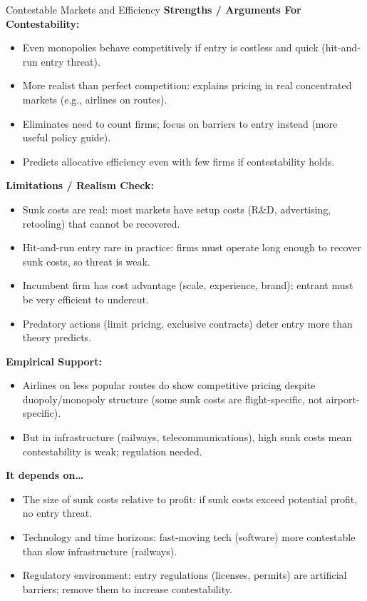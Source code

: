 \documentclass[11pt, a4paper, twoside]{book}
\begin{document}
\begin{evaluation}{Contestable Markets and Efficiency}
\textbf{Strengths / Arguments For Contestability:}
\begin{itemize}[leftmargin=*, nosep]
\item Even monopolies behave competitively if entry is costless and quick (hit-and-run entry threat).
\item More realist than perfect competition: explains pricing in real concentrated markets (e.g., airlines on routes).
\item Eliminates need to count firms; focus on barriers to entry instead (more useful policy guide).
\item Predicts allocative efficiency even with few firms if contestability holds.
\end{itemize}
\textbf{Limitations / Realism Check:}
\begin{itemize}[leftmargin=*, nosep]
\item Sunk costs are real: most markets have setup costs (R\&D, advertising, retooling) that cannot be recovered.
\item Hit-and-run entry rare in practice: firms must operate long enough to recover sunk costs, so threat is weak.
\item Incumbent firm has cost advantage (scale, experience, brand); entrant must be very efficient to undercut.
\item Predatory actions (limit pricing, exclusive contracts) deter entry more than theory predicts.
\end{itemize}
\textbf{Empirical Support:}
\begin{itemize}[leftmargin=*, nosep]
\item Airlines on less popular routes do show competitive pricing despite duopoly/monopoly structure (some sunk costs are flight-specific, not airport-specific).
\item But in infrastructure (railways, telecommunications), high sunk costs mean contestability is weak; regulation needed.
\end{itemize}
\textbf{It depends on\ldots}
\begin{itemize}[leftmargin=*, nosep]
\item The size of sunk costs relative to profit: if sunk costs exceed potential profit, no entry threat.
\item Technology and time horizons: fast-moving tech (software) more contestable than slow infrastructure (railways).
\item Regulatory environment: entry regulations (licenses, permits) are artificial barriers; remove them to increase contestability.
\end{itemize}
\end{evaluation}
\end{document}
